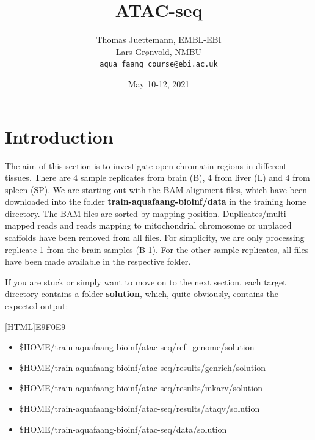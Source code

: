 \documentclass[12pt]{article}
\begin{document}
	
	\title{ATAC-seq} 
	\author{Thomas Juettemann, EMBL-EBI\\
		Lars Gr\o nvold, NMBU\\		
		\texttt{aqua\_faang\_course@ebi.ac.uk}}  %
	\date{May 10-12, 2021}  %
	\maketitle
	
	
	
	
	\section{Introduction}
	The aim of this section  is to investigate open chromatin regions in different tissues.  
	There are 4 sample replicates from brain (B), 4 from liver (L) and 4 from spleen (SP). 
	We are starting out with the BAM alignment files, which have been downloaded into the folder \textbf{train-aquafaang-bioinf/data} in the training home directory. 
	The BAM files are sorted by mapping position. 
	Duplicates/multi-mapped reads and reads mapping to mitochondrial chromosome or unplaced scaffolds have been removed from all files.
	For simplicity, we are only processing replicate 1 from the brain samples (B-1). 
	For the other sample replicates, all files have been made available in the respective folder.
	
	If you are stuck or simply want to move on to the next section, each target directory contains a folder  \textbf{solution}, which, quite obviously, contains the expected output:

	\vspace{0.5cm}

	[HTML]{E9F0E9}{\parbox{\linewidth}{%
			\begin{itemize}
				\item \$HOME/train-aquafaang-bioinf/atac-seq/ref\_genome/solution
				\item \$HOME/train-aquafaang-bioinf/atac-seq/results/genrich/solution
				\item \$HOME/train-aquafaang-bioinf/atac-seq/results/mkarv/solution
				\item \$HOME/train-aquafaang-bioinf/atac-seq/results/ataqv/solution
				\item \$HOME/train-aquafaang-bioinf/atac-seq/data/solution
			\end{itemize}
	}}
\end{document}

